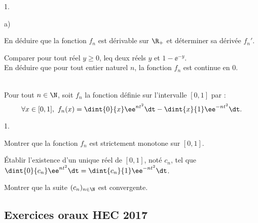 \begin{exerciceAP}
\begin{noliste}{1.}
\begin{noliste}{a)}
    \item En déduire que la fonction $f_n$ est dérivable sur $\R_+$ et
      déterminer sa dérivée $f_n'$.
    
    \item Comparer pour tout réel $y\geq 0$, leq deux réels $y$ et
      $1-\ee^{-y}$.\\
      En déduire que pour tout entier naturel $n$, la fonction $f_n$
      est continue en $0$.
    \end{noliste}
  \end{noliste}
\end{exerciceAP} 



\begin{exerciceSP}~\\
Pour tout $n\in\N$, soit $f_n$ la fonction définie sur l'intervalle 
$[0,1]$ par :
\[
\forall x\in[0,1], \ f_n(x)=\dint{0}{x} \ee^{nt^2}\dt - \dint{x}{1} 
\ee^{-nt^2}\dt.
\]
\begin{noliste}{1.}
    \setlength{\itemsep}{2mm}
\item Montrer que la fonction $f_n$ est strictement monotone sur 
$[0,1]$.
\item Établir l'existence d'un unique réel de $[0,1]$, noté $c_n$, tel 
que $\dint{0}{c_n} \ee^{nt^2}\dt = \dint{c_n}{1} \ee^{-nt^2}\dt$.
\item Montrer que la suite $(c_n)_{n\in\N}$ est convergente.
\end{noliste}
\end{exerciceSP} 


\subsection*{Exercices oraux HEC 2017}


